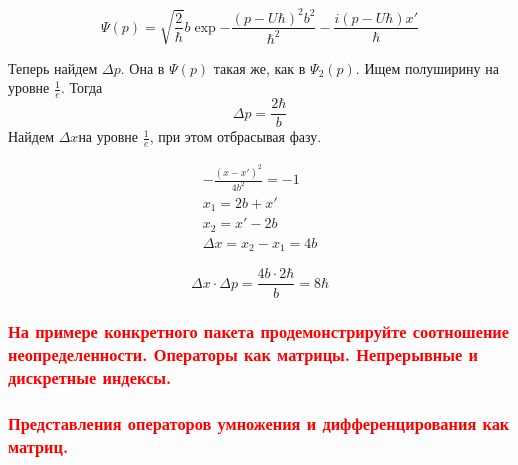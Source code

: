 \begin{equation}
	\Psi(p)=\sqrt{\frac{2}{\hbar}}b\exp{-\frac{(p-U\hbar)^2b^2}{\hbar^2}-\frac{i(p-U\hbar)x'}{\hbar} }
\end{equation}

Теперь найдем $\Delta p$. Она в $\Psi(p)$ такая же, как в $\Psi_2(p)$. Ищем полуширину на уровне $\frac{1}{e}$. Тогда
$$\Delta p=\frac{2\hbar}{b}$$
Найдем $\Delta x$на уровне $\frac1e$, при этом отбрасывая фазу.

\begin{gather*}
	-\frac{(x-x')^2}{4b^2}=-1 \\
	x_1=2b+x'\\
	x_2=x'-2b\\
	\Delta x= x_2-x_1=4b
\end{gather*}

$$\Delta x\cdot \Delta p=\frac{4b\cdot2\hbar}{b}=8\hbar  $$

\subsubsection{\textcolor{red} {На примере конкретного пакета продемонстрируйте соотношение неопределенности. Операторы как матрицы. Непрерывные и дискретные индексы.} }


\subsubsection{\textcolor{red} {Представления операторов умножения и дифференцирования как матриц.} }